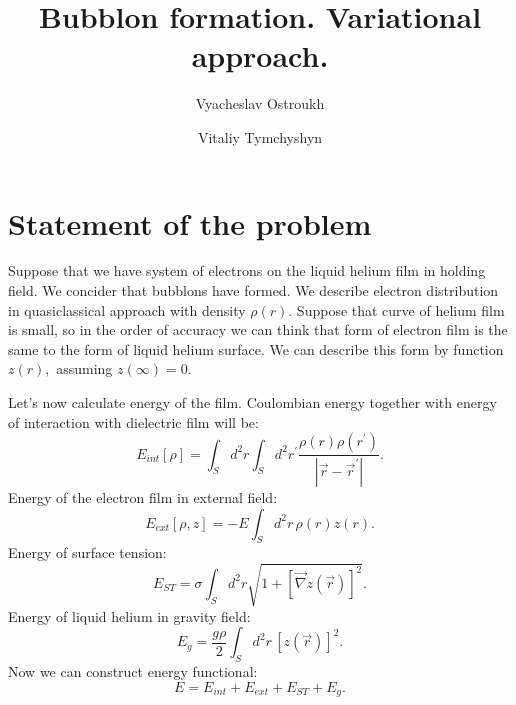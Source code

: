 \documentclass[10pt]{article}
\title{Bubblon formation. Variational approach.}
\author{Vyacheslav Ostroukh}
\author{Vitaliy Tymchyshyn}
\begin{document}



\section{Statement of the problem}

Suppose that we have system of electrons on the liquid helium film in holding field.
We concider that bubblons have formed.
We describe electron distribution in quasiclassical approach with density $\rho(r).$
Suppose that curve of helium film is small, so in the order of accuracy we can think that form of electron film is the same to the form of liquid helium surface.
We can describe this form by function $z(r),$ assuming $z(\infty)=0.$

Let's now calculate energy of the film.
Coulombian energy together with energy of interaction with dielectric film will be:
\begin{equation}
    E_{int} [\rho] = \int_S d^2 r \int_S d^2 r^{\prime} \frac{\rho(r) \rho(r^{\prime})}{|\vec{r} - \vec{r}^{\prime}|}.
\end{equation}
Energy of the electron film in external field:
\begin{equation}
  E_{ext} [\rho,z] = -E \int_S d^2 r \, \rho(r) z(r).
\end{equation}
Energy of surface tension:
\begin{equation}
  E_{ST} = \sigma \int_S d^2 r \sqrt{ 1 + \left[ \vec{\nabla} z(\vec{r}) \right]^2 }.
\end{equation}
Energy of liquid helium in gravity field:
\begin{equation}
  E_g = \frac{g \rho}{2} \int_S d^2 r \, [z(\vec{r})]^2 .
\end{equation}
Now we can construct energy functional:
\begin{equation}
  E = E_{int} + E_{ext} + E_{ST} + E_g.
\end{equation}
\end{document}
